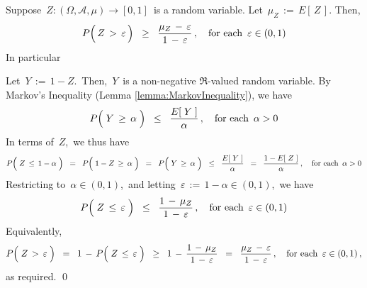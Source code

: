 
\vskip 1.0cm
\begin{corollary}
\label{corollary:MarkovInequality}
\mbox{}\vskip 0.2cm
\noindent
Suppose \,$Z : (\Omega,\mathcal{A},\mu) \longrightarrow [0,1]$\,
is a random variable. Let \,$\mu_{Z} \,:=\, E\!\left[\,Z\,\right]$.
Then,
\begin{equation*}
P\!\left(\,Z \,\overset{{\color{white}.}}{>}\, \varepsilon\,\right)
\;\; \geq \;\;
	\dfrac{\mu_{Z} \,-\, \varepsilon}{1\,-\,\varepsilon}\,,
\quad
\textnormal{for each \,$\varepsilon \in (0,1)$}
\end{equation*}
In particular
\end{corollary}
\proof
Let \,$Y \,:=\, 1 - Z$.\, Then, \,$Y$\, is a non-negative $\Re$-valued random variable.
By Markov's Inequality (Lemma \ref{lemma:MarkovInequality}), we have
\begin{equation*}
P\!\left(\; Y \,\overset{{\color{white}.}}{\geq}\, \alpha \;\right)
\;\; \leq \;\;
	\dfrac{ E\!\left[\; Y \;\right] }{ \alpha }\,,
\quad
\textnormal{for each \,$\alpha > 0$}
\end{equation*}
In terms of \,$Z$,\, we thus have
\begin{equation*}
P\!\left(\; Z \,\overset{{\color{white}.}}{\leq}\, 1 - \alpha \;\right)
\;\; = \;\;
	P\!\left(\; 1 - Z \,\overset{{\color{white}.}}{\geq}\, \alpha \;\right)
\;\; = \;\;
	P\!\left(\; Y \,\overset{{\color{white}.}}{\geq}\, \alpha \;\right)
\;\; \leq \;\;
	\dfrac{ E\!\left[\; Y \;\right] }{ \alpha }
\;\; = \;\;
	\dfrac{ 1 - E\!\left[\; Z \;\right] }{ \alpha }\,,
\quad
\textnormal{for each \,$\alpha > 0$}
\end{equation*}
Restricting to \,$\alpha \in (0,1)$,\, and letting \,$\varepsilon \,:=\, 1 - \alpha \in (0,1)$,\, we have
\begin{equation*}
P\!\left(\; Z \,\overset{{\color{white}.}}{\leq}\, \varepsilon \;\right)
\;\; \leq \;\;
	\dfrac{ 1 \,-\, \mu_{Z} }{ 1 \,-\, \varepsilon }\,,
\quad
\textnormal{for each \,$\varepsilon \in (0,1)$}
\end{equation*}
Equivalently,
\begin{equation*}
P\!\left(\; Z \,\overset{{\color{white}.}}{>}\, \varepsilon \;\right)
\;\; = \;\;
	1 \,-\, P\!\left(\; Z \,\overset{{\color{white}.}}{\leq}\, \varepsilon \;\right)
\;\; \geq \;\;
	1 \,-\, \dfrac{ 1 \,-\, \mu_{Z} }{ 1 \,-\, \varepsilon }
\;\; = \;\;
	\dfrac{ \mu_{Z} \,-\, \varepsilon }{ 1 \,-\, \varepsilon }\,,
\quad
\textnormal{for each \,$\varepsilon \in (0,1)$}\,,
\end{equation*}
as required.
\qed

